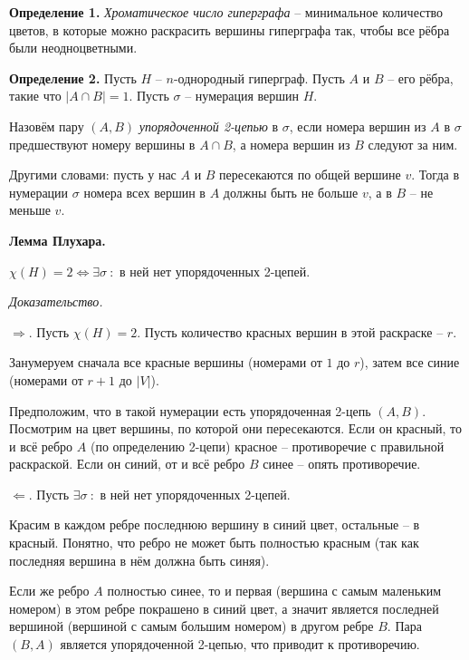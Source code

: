 \textbf{Определение 1.}
\textit{Хроматическое число гиперграфа} -- минимальное количество цветов, в которые можно раскрасить вершины гиперграфа так, чтобы все рёбра были неодноцветными.

\textbf{Определение 2.}
Пусть $H$ -- $n$-однородный гиперграф. 
Пусть $A$ и $B$ -- его рёбра, такие что $|A \cap B| = 1$.
Пусть $\sigma$ -- нумерация вершин $H$.

Назовём пару $(A, B)$ \textit{упорядоченной 2-цепью} в $\sigma$, если номера вершин из $A$
в $\sigma$ предшествуют номеру вершины в $A \cap B$, а номера вершин из $B$ следуют за ним.

Другими словами: пусть у нас $A$ и $B$ пересекаются по общей вершине $v$. Тогда в нумерации $\sigma$ номера всех вершин в $A$ должны быть не больше $v$, а в $B$ -- не меньше $v$.

\textbf{Лемма Плухара.}

$\chi(H) = 2 \Leftrightarrow \exists \sigma \ :$ в ней нет упорядоченных 2-цепей.

\textit{Доказательство.}

$\Rightarrow$. Пусть $\chi(H) = 2$. Пусть количество красных вершин в этой раскраске -- $r$.

Занумеруем сначала все красные вершины (номерами от $1$ до $r$), затем все синие (номерами от $r + 1$ до $|V|$).

Предположим, что в такой нумерации есть упорядоченная 2-цепь $(A, B)$. Посмотрим на цвет вершины, по которой они пересекаются. Если он красный, то и всё ребро $A$ (по определению 2-цепи) красное -- противоречие с правильной раскраской. Если он синий, от и всё ребро $B$ синее -- опять противоречие.

$\Leftarrow$. Пусть $\exists \sigma \ :$ в ней нет упорядоченных 2-цепей.

Красим в каждом ребре последнюю вершину в синий цвет, остальные -- в красный.
Понятно, что ребро не может быть полностью красным (так как последняя вершина в нём должна быть синяя).

Если же ребро $A$ полностью синее, то и первая (вершина с самым маленьким номером) в этом ребре покрашено в синий цвет, а значит является последней вершиной (вершиной с самым большим номером) в другом ребре $B$. Пара $(B, A)$ является упорядоченной 2-цепью, что приводит к противоречию.